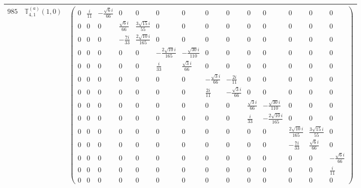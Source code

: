 \documentclass[fleqn,8pt,landscape]{jsarticle}
\begin{document}
\begin{center}
\begin{longtable}{ccc}
$ 985 $ & $ \mathbb{T}_{4,1}^{(a)}(1,0) $ & $ \begin{pmatrix} 0 & \frac{i}{11} & - \frac{\sqrt{6} i}{66} & 0 & 0 & 0 & 0 & 0 & 0 & 0 & 0 & 0 & 0 & 0 \\ 0 & 0 & 0 & \frac{\sqrt{6} i}{66} & \frac{3 \sqrt{15} i}{55} & 0 & 0 & 0 & 0 & 0 & 0 & 0 & 0 & 0 \\ 0 & 0 & 0 & - \frac{7 i}{33} & \frac{2 \sqrt{10} i}{165} & 0 & 0 & 0 & 0 & 0 & 0 & 0 & 0 & 0 \\ 0 & 0 & 0 & 0 & 0 & - \frac{2 \sqrt{10} i}{165} & - \frac{\sqrt{30} i}{110} & 0 & 0 & 0 & 0 & 0 & 0 & 0 \\ 0 & 0 & 0 & 0 & 0 & \frac{i}{33} & \frac{\sqrt{3} i}{66} & 0 & 0 & 0 & 0 & 0 & 0 & 0 \\ 0 & 0 & 0 & 0 & 0 & 0 & 0 & - \frac{\sqrt{3} i}{66} & - \frac{2 i}{11} & 0 & 0 & 0 & 0 & 0 \\ 0 & 0 & 0 & 0 & 0 & 0 & 0 & \frac{2 i}{11} & - \frac{\sqrt{3} i}{66} & 0 & 0 & 0 & 0 & 0 \\ 0 & 0 & 0 & 0 & 0 & 0 & 0 & 0 & 0 & \frac{\sqrt{3} i}{66} & - \frac{\sqrt{30} i}{110} & 0 & 0 & 0 \\ 0 & 0 & 0 & 0 & 0 & 0 & 0 & 0 & 0 & \frac{i}{33} & - \frac{2 \sqrt{10} i}{165} & 0 & 0 & 0 \\ 0 & 0 & 0 & 0 & 0 & 0 & 0 & 0 & 0 & 0 & 0 & \frac{2 \sqrt{10} i}{165} & \frac{3 \sqrt{15} i}{55} & 0 \\ 0 & 0 & 0 & 0 & 0 & 0 & 0 & 0 & 0 & 0 & 0 & - \frac{7 i}{33} & \frac{\sqrt{6} i}{66} & 0 \\ 0 & 0 & 0 & 0 & 0 & 0 & 0 & 0 & 0 & 0 & 0 & 0 & 0 & - \frac{\sqrt{6} i}{66} \\ 0 & 0 & 0 & 0 & 0 & 0 & 0 & 0 & 0 & 0 & 0 & 0 & 0 & \frac{i}{11} \\ 0 & 0 & 0 & 0 & 0 & 0 & 0 & 0 & 0 & 0 & 0 & 0 & 0 & 0 \end{pmatrix} $ \\ \hline

\end{longtable}
\end{center}
\end{document}
